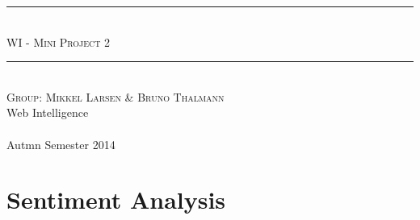 


\begin{titlepage}
\newcommand{\HRule}{\rule{\linewidth}{0.5mm}}

\begin{center}

\HRule \\[0.5cm]
\textsc{ \Huge WI - Mini Project 2}\\

\HRule \\[3cm]

\textsc{\Large Group: Mikkel Larsen \& Bruno Thalmann} \\[1cm]


\vfill
{\Large Web Intelligence}
\\ ~\\
{\large Autmn Semester 2014}

\end{center}
\end{titlepage}



%


\setcounter{tocdepth}{1}
\tableofcontents

\clearpage



\clearpage





\chapter{Sentiment Analysis}


%



\label{LastPage}

